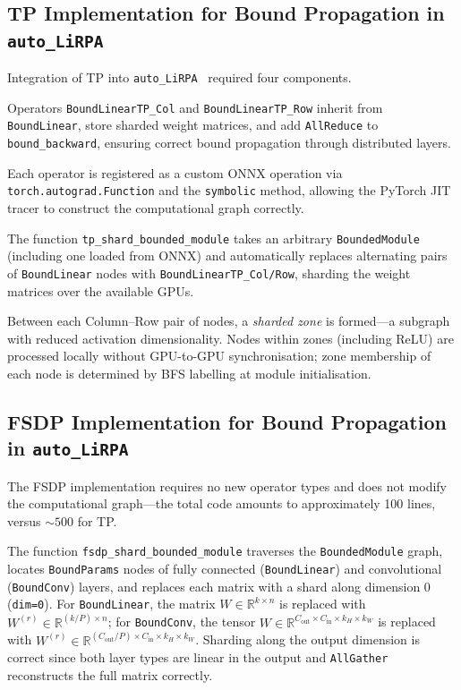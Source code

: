 \subsection{TP Implementation for Bound Propagation in \texttt{auto\_LiRPA}}

Integration of TP into \texttt{auto\_LiRPA}~\cite{AutoLiRPARepo} required four
components.

Operators \texttt{BoundLinearTP\_Col} and \texttt{BoundLinearTP\_Row} inherit
from \texttt{BoundLinear}, store sharded weight matrices, and add
\texttt{AllReduce} to \texttt{bound\_backward}, ensuring correct bound
propagation through distributed layers.

Each operator is registered as a custom ONNX operation via
\texttt{torch.autograd.Function} and the \texttt{symbolic} method, allowing
the PyTorch JIT tracer to construct the computational graph correctly.

The function \texttt{tp\_shard\_bounded\_module} takes an arbitrary
\texttt{BoundedModule} (including one loaded from ONNX) and automatically
replaces alternating pairs of \texttt{BoundLinear} nodes with
\texttt{BoundLinearTP\_Col/Row}, sharding the weight matrices over the
available GPUs.

Between each Column--Row pair of nodes, a \textit{sharded zone} is formed---a
subgraph with reduced activation dimensionality. Nodes within zones (including
ReLU) are processed locally without GPU-to-GPU synchronisation; zone membership
of each node is determined by BFS labelling at module initialisation.

\subsection{FSDP Implementation for Bound Propagation in \texttt{auto\_LiRPA}}

The FSDP implementation requires no new operator types and does not modify the
computational graph---the total code amounts to approximately 100 lines, versus
${\sim}500$ for TP.

The function \texttt{fsdp\_shard\_bounded\_module} traverses the
\texttt{BoundedModule} graph, locates \texttt{BoundParams} nodes of fully
connected (\texttt{BoundLinear}) and convolutional (\texttt{BoundConv}) layers,
and replaces each matrix with a shard along dimension 0 (\texttt{dim=0}).
For \texttt{BoundLinear}, the matrix $W \in \mathbb{R}^{k \times n}$ is
replaced with $W^{(r)} \in \mathbb{R}^{(k/P) \times n}$; for
\texttt{BoundConv}, the tensor
$W \in \mathbb{R}^{C_\text{out} \times C_\text{in} \times k_H \times k_W}$
is replaced with
$W^{(r)} \in \mathbb{R}^{(C_\text{out}/P) \times C_\text{in} \times k_H \times k_W}$.
Sharding along the output dimension is correct since both layer types are
linear in the output and \texttt{AllGather} reconstructs the full matrix correctly.

